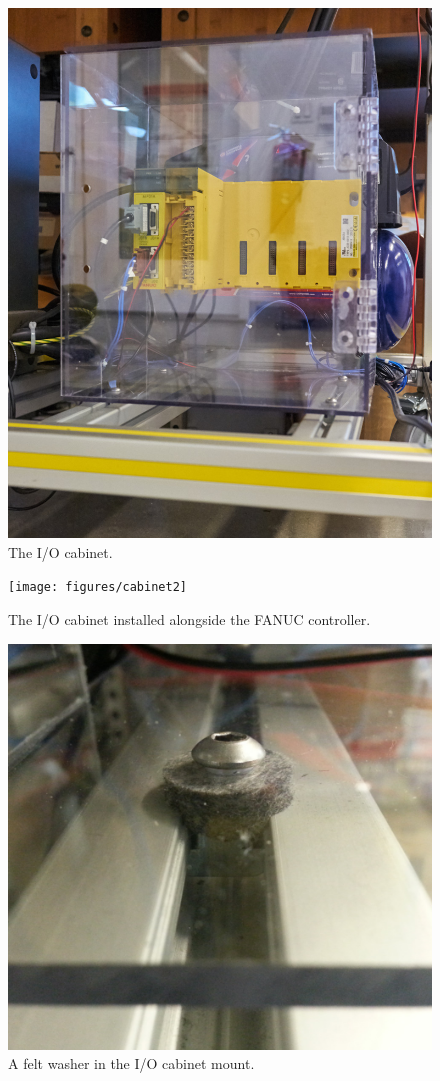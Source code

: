 \begin{figure}
    \centering
    \includegraphics[width=.5\linewidth]{figures/cabinet1}
    \caption{The I/O cabinet.}
    \label{fig:cabinet-1}
    \end{figure}

\begin{figure}
    \centering
    \texttt{[image: figures/cabinet2]}
    \caption{The I/O cabinet installed alongside the FANUC controller.}
    \label{fig:cabinet-2}
\end{figure}

\begin{figure}
    \centering
    \includegraphics[width=.8\linewidth]{figures/felt-washer}
    \caption{A felt washer in the I/O cabinet mount.}
    \label{fig:felt-washer}
\end{figure}

